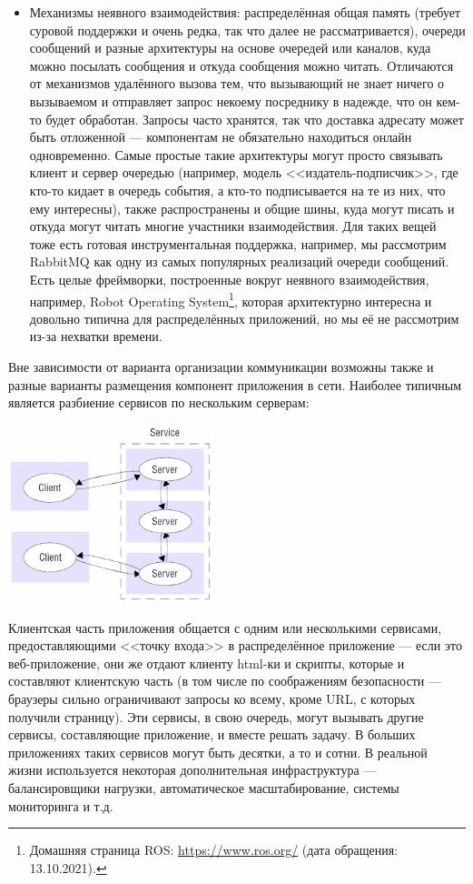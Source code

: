 \documentclass[a5paper]{article}
\begin{document}
\begin{itemize}
    \item Механизмы неявного взаимодействия: распределённая общая память (требует суровой поддержки и очень редка, так что далее не рассматривается), очереди сообщений и разные архитектуры на основе очередей или каналов, куда можно посылать сообщения и откуда сообщения можно читать. Отличаются от механизмов удалённого вызова тем, что вызывающий не знает ничего о вызываемом и отправляет запрос некоему посреднику в надежде, что он кем-то будет обработан. Запросы часто хранятся, так что доставка адресату может быть отложенной --- компонентам не обязательно находиться онлайн одновременно. Самые простые такие архитектуры могут просто связывать клиент и сервер очередью (например, модель <<издатель-подписчик>>, где кто-то кидает в очередь события, а кто-то подписывается на те из них, что ему интересны), также распространены и общие шины, куда могут писать и откуда могут читать многие участники взаимодействия. Для таких вещей тоже есть готовая инструментальная поддержка, например, мы рассмотрим RabbitMQ как одну из самых популярных реализаций очереди сообщений. Есть целые фреймворки, построенные вокруг неявного взаимодействия, например, Robot Operating System\footnote{Домашняя страница ROS: \url{https://www.ros.org/} (дата обращения: 13.10.2021).}, которая архитектурно интересна и довольно типична для распределённых приложений, но мы её не рассмотрим из-за нехватки времени.
\end{itemize}

Вне зависимости от варианта организации коммуникации возможны также и разные варианты размещения компонент приложения в сети. Наиболее типичным является разбиение сервисов по нескольким серверам:

\begin{center}
    \includegraphics[width=0.45\textwidth]{clientServer.png}
\end{center}

Клиентская часть приложения общается с одним или несколькими сервисами, предоставляющими <<точку входа>> в распределённое приложение --- если это веб-приложение, они же отдают клиенту html-ки и скрипты, которые и составляют клиентскую часть (в том числе по соображениям безопасности --- браузеры сильно ограничивают запросы ко всему, кроме URL, с которых получили страницу). Эти сервисы, в свою очередь, могут вызывать другие сервисы, составляющие приложение, и вместе решать задачу. В больших приложениях таких сервисов могут быть десятки, а то и сотни. В реальной жизни используется некоторая дополнительная инфраструктура --- балансировщики нагрузки, автоматическое масштабирование, системы мониторинга и т.д.
\end{document}
